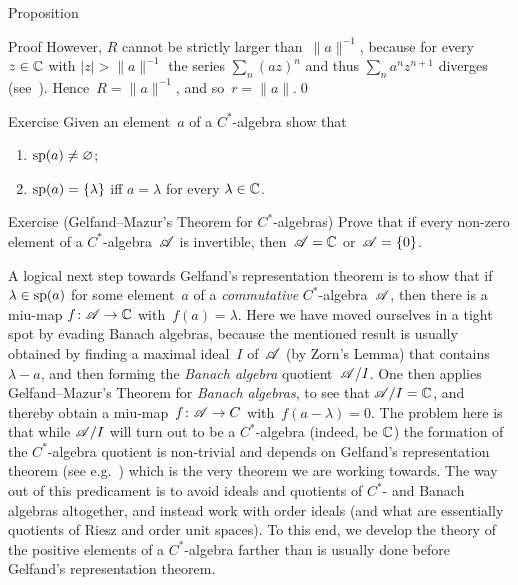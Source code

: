 \documentclass[main]{subfiles}
\begin{document}
\begin{parsec}
\begin{point}{Proposition}
\begin{point}{Proof}
However, $R$ cannot be strictly larger than~$\|a\|^{-1}$,
because for every $z\in\mathbb{C}$ with $\left|z\right|>\|a\|^{-1}$
the series $\sum_n(az)^n$ 
and thus $\sum_n a^n{z}^{n+1}$ diverges (see~).
Hence~$R=\|a\|^{-1}$, and so~$r=\|a\|$.\qed
\end{point}
\end{point}
\begin{point}{Exercise}%
Given an element~$a$ of a $C^*$-algebra show that
\begin{enumerate}
\item $\mathrm{sp}(a)\neq \varnothing$;
\item $\mathrm{sp}(a) =\{\lambda\}$ iff $a=\lambda$ for every $\lambda \in\mathbb{C}$.
\end{enumerate}
\end{point}
\begin{point}{Exercise (Gelfand--Mazur's Theorem for $C^*$-algebras)}%
Prove that if every non-zero element of a $C^*$-algebra~$\mathscr{A}$
is invertible, then~$\mathscr{A}=\mathbb{C}$ or~$\mathscr{A}=\{0\}$.
\end{point}
\begin{point}%
A logical next step
towards Gelfand's representation theorem
is to show that if~$\lambda\in\mathrm{sp}(a)$
for some element~$a$ of a \emph{commutative} $C^*$-algebra~$\mathscr{A}$,
then there is a miu-map $f\colon \mathscr{A}\to \mathbb{C}$
with~$f(a)=\lambda$.
Here we have moved ourselves in a tight spot
by evading Banach algebras,
because the mentioned result is usually obtained
by finding a maximal ideal~$I$ of~$\mathscr{A}$
(by Zorn's Lemma) that contains~$\lambda-a$,
and then forming the \emph{Banach algebra} quotient~$\mathscr{A}/I$.
One then applies Gelfand--Mazur's Theorem for \emph{Banach algebras}, 
to see that
$\mathscr{A}/I= \mathbb{C}$,
and thereby obtain a miu-map~$f\colon \mathscr{A}\to C$ with~$f(a-\lambda)=0$.
The problem here is that while $\mathscr{A}/I$
will turn out to be a $C^*$-algebra (indeed, be $\mathbb{C}$)
the formation of the $C^*$-algebra quotient
is non-trivial and depends on Gelfand's representation theorem
(see e.g.~)
which is the very theorem we are working towards.
The way out of this predicament
is to avoid ideals and quotients of $C^*$- and Banach algebras
altogether,
and instead work 
with order ideals (and what are essentially
 quotients of Riesz and order unit spaces).
To this end,
we develop the theory
of the positive elements of a $C^*$-algebra
farther than is usually done
before Gelfand's representation theorem.
\end{point}
\end{parsec}
\end{document}
